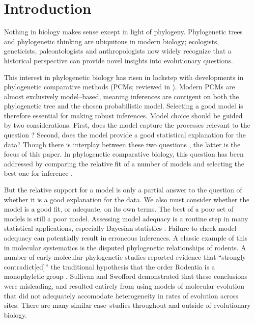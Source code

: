 \documentclass[a4paper,12pt]{article}
\begin{document}
\section{Introduction}
Nothing in biology makes sense except in light of phylogeny. Phylogenetic trees and phylogenetic thinking are ubiquitous in modern biology; ecologists, geneticists, paleontologists and anthropologists now widely recognize that a historical perspective can provide novel insights into evolutionary questions. 

This interest in phylogenetic biology has risen in lockstep with developments in phylogenetic comparative methods (PCMs; reviewed in \citep{PennellHarmon}). Modern PCMs are almost exclusively model--based, meaning inferences are contigent on both the phylogenetic tree and the chosen probabilistic model. Selecting a good model is therefore essential for making robust inferences. Model choice should be guided by two considerations. First, does the model capture the processes relevant to the question \citep{HansenOrzack2005, Hansen2012, PennellPE}? Second, does the model provide a good statistical explanation for the data? Though there is interplay between these two questions \citep{Hansen2012}, the latter is the focus of this paper. In phylogenetic comparative biology, this question has been addressed by comparing the relative fit of a number of models and selecting the best one for inference \citep{Mooers1999, Harmon2010, Hunt2012}. 

But the relative support for a model is only a partial answer to the question of whether it is a good explanation for the data. We also must consider whether the model is a good fit, or adequate, on its own terms. The best of a poor set of models is still a poor model. Assessing model adequacy is a routine step in many statistical applications, especially Bayesian statistics \citep{Gelmanbook}. Failure to check model adequacy can potentially result in erroneous inferences. A classic example of this in molecular systematics is the disputed phylogenetic relationships of rodents. A number of early molecular phylogenetic studies reported evidence that ``strongly contradict[ed]'' the traditional hypothesis that the order Rodentia is a monophyletic group \citep{Graur1991, DErchia1996}. Sullivan and Swofford \citep{SullivanSwofford} demonstrated that these conclusions were misleading, and resulted entirely from using models of molecular evolution that did not adequately accomodate  heterogeneity in rates of evolution across sites. There are many similar case--studies throughout and outside of evolutionary biology.
\end{document}
